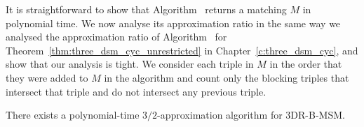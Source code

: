 

It is straightforward to show that Algorithm~ returns a matching $M$ in polynomial time. We now analyse its approximation ratio in the same way we analysed the approximation ratio of Algorithm~ for Theorem~\ref{thm:three_dsm_cyc_unrestricted} in Chapter~\ref{c:three_dsm_cyc}, and show that our analysis is tight. We consider each triple in $M$ in the order that they were added to $M$ in the algorithm and count only the blocking triples that intersect that triple and do not intersect any previous triple.

\begin{thm}
\label{thm:threed_sr_b_approxalgo}
There exists a polynomial-time $3/2$-approximation algorithm for 3DR-B-MSM.
\end{thm}
